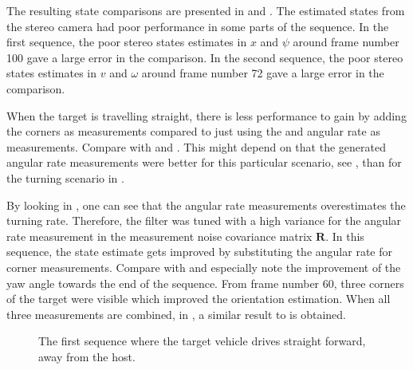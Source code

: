 The resulting state comparisons are presented in  and .
The estimated states from the stereo camera had poor performance in some parts of the sequence.
In the first sequence, the poor stereo states estimates in $x$ and $\psi$ around frame number 100 gave a large error in the comparison.
In the second sequence, the poor stereo states estimates in $v$ and $\omega$ around frame number 72 gave a large error in the comparison.

When the target is travelling straight, there is less performance to gain by adding the corners as measurements compared to just using the \abbrROI and angular rate as measurements.
Compare  with  and .
This might depend on that the generated angular rate measurements were better for this particular scenario, see , than for the turning scenario in .

By looking in , one can see that the angular rate measurements overestimates the turning rate.
Therefore, the filter was tuned with a high variance for the angular rate measurement in the measurement noise covariance matrix $\bm{R}$.
In this sequence, the state estimate gets improved by substituting the angular rate for corner measurements.
Compare  with  and especially note the improvement of the yaw angle towards the end of the sequence.
From frame number 60, three corners of the target were visible which improved the orientation estimation.
When all three measurements are combined, in , a similar result to  is obtained.

\begin{figure}[!ht]
	\centering


	\caption{\label{fig:sequence155532} The first sequence where the target vehicle drives straight forward, away from the host.}
\end{figure}

